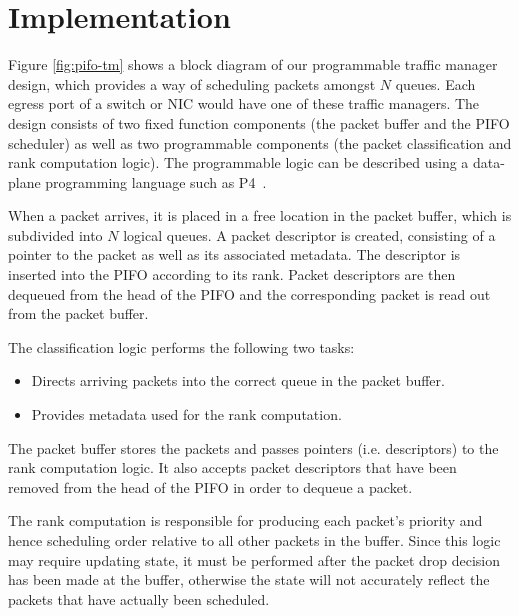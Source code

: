 \section{Implementation}


Figure \ref{fig:pifo-tm} shows a block diagram of our programmable traffic manager design, which provides a way of scheduling packets amongst $N$ queues. Each egress port of a switch or NIC would have one of these traffic managers. The design consists of two fixed function components (the packet buffer and the PIFO scheduler) as well as two programmable components (the packet classification and rank computation logic). The programmable logic can be described using a data-plane  programming language such as P4~\cite{p4:2014}.

When a packet arrives, it is placed in a free location in the packet buffer, which is subdivided into $N$ logical queues. A packet descriptor is created, consisting of a pointer to the packet as well as its associated metadata.  The descriptor is inserted into the PIFO according to its rank.  Packet descriptors are then dequeued from the head of the PIFO and the corresponding packet is read out from the packet buffer.


The classification logic performs the following two tasks:
\begin{itemize}
\item Directs arriving packets into the correct queue in the packet buffer.
\item Provides metadata used for the rank computation.
\end{itemize}

The packet buffer stores the packets and passes pointers (i.e. descriptors) to the rank computation logic. It also accepts packet descriptors that have been removed from the head of the PIFO in order to dequeue a packet.

The rank computation is responsible for producing each packet's priority and hence scheduling order relative to all other packets in the buffer. Since this logic may require updating state, it must be performed after the packet drop decision has been made at the buffer, otherwise the state will not accurately reflect the packets that have actually been scheduled.

